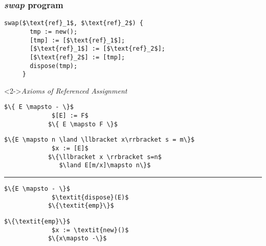 \documentclass{beamer}
\begin{document}
	\begin{frame}[fragile]
	\frametitle{\textit{swap} program}
	\begin{minipage}{0.4\textwidth}
	\begin{lstlisting}[mathescape]
	 swap($\text{ref}_1$, $\text{ref}_2$) {
	   tmp := new();
	   [tmp] := [$\text{ref}_1$];
	   [$\text{ref}_1$] := [$\text{ref}_2$];
	   [$\text{ref}_2$] := [tmp];
	   dispose(tmp);
	 }
	\end{lstlisting}
	\end{minipage}\noindent
	\begin{minipage}{0.6\textwidth}
		\begin{block}<2->{\emph{Axioms of Referenced Assignment}}
			\begin{minipage}{0.5\textwidth}
			\begin{lstlisting}[mathescape]
			$\{ E \mapsto - \}$
			 $[E] := F$
			$\{ E \mapsto F \}$
			\end{lstlisting}
			\end{minipage}\noindent
			\vline
			\begin{minipage}{0.5\textwidth}
			\begin{lstlisting}[mathescape]
			$\{E \mapsto n \land \llbracket x\rrbracket s = m\}$
			 $x := [E]$
			$\{\llbracket x \rrbracket s=n$
			   $\land E[m/x]\mapsto n\}$
			\end{lstlisting}
			\end{minipage}
			\rule{\textwidth}{1pt}
			\begin{minipage}{0.5\textwidth}
			\begin{lstlisting}[mathescape]
			$\{E \mapsto - \}$
			 $\textit{dispose}(E)$
			$\{\textit{emp}\}$
			\end{lstlisting}
			\end{minipage}\noindent
			\vline
			\begin{minipage}{0.5\textwidth}
			\begin{lstlisting}[mathescape]
			$\{\textit{emp}\}$
			 $x := \textit{new}()$
			$\{x\mapsto -\}$
			\end{lstlisting}
			\end{minipage}
		\end{block}
	\end{minipage}
	\end{frame}
\end{document}
